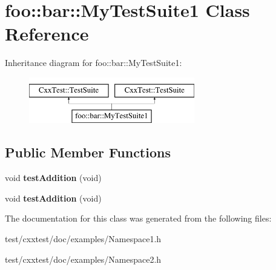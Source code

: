 \hypertarget{classfoo_1_1bar_1_1MyTestSuite1}{\section{foo\-:\-:bar\-:\-:My\-Test\-Suite1 Class Reference}
\label{classfoo_1_1bar_1_1MyTestSuite1}
}
Inheritance diagram for foo\-:\-:bar\-:\-:My\-Test\-Suite1\-:\begin{figure}[H]
\begin{center}
\leavevmode
\includegraphics[height=2.000000cm]{classfoo_1_1bar_1_1MyTestSuite1}
\end{center}
\end{figure}
\subsection*{Public Member Functions}
\begin{DoxyCompactItemize}
\item 
\hypertarget{classfoo_1_1bar_1_1MyTestSuite1_ae76feb5a9b886b27e1aa54e6f2d1c099}{void {\bfseries test\-Addition} (void)}\label{classfoo_1_1bar_1_1MyTestSuite1_ae76feb5a9b886b27e1aa54e6f2d1c099}

\item 
\hypertarget{classfoo_1_1bar_1_1MyTestSuite1_ae76feb5a9b886b27e1aa54e6f2d1c099}{void {\bfseries test\-Addition} (void)}\label{classfoo_1_1bar_1_1MyTestSuite1_ae76feb5a9b886b27e1aa54e6f2d1c099}

\end{DoxyCompactItemize}


The documentation for this class was generated from the following files\-:\begin{DoxyCompactItemize}
\item 
test/cxxtest/doc/examples/Namespace1.\-h\item 
test/cxxtest/doc/examples/Namespace2.\-h\end{DoxyCompactItemize}
